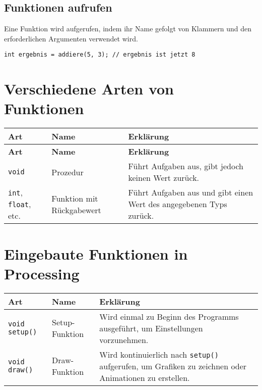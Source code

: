 \documentclass{article}
\begin{document}
\subsection*{Funktionen aufrufen}

Eine Funktion wird aufgerufen, indem ihr Name gefolgt von Klammern und den erforderlichen Argumenten verwendet wird.

\begin{lstlisting}
int ergebnis = addiere(5, 3); // ergebnis ist jetzt 8
\end{lstlisting}

\section*{Verschiedene Arten von Funktionen}

\begin{longtable}{|p{}|p{}|p{}|}
\hline
\textbf{Art} & \textbf{Name} & \textbf{Erklärung} \\
\hline
\endfirsthead

\hline
\textbf{Art} & \textbf{Name} & \textbf{Erklärung} \\
\hline
\endhead

\texttt{void} & Prozedur & Führt Aufgaben aus, gibt jedoch keinen Wert zurück. \\
\hline

\texttt{int}, \texttt{float}, etc. & Funktion mit Rückgabewert & Führt Aufgaben aus und gibt einen Wert des angegebenen Typs zurück. \\
\hline

\end{longtable}

\section*{Eingebaute Funktionen in Processing}

\begin{longtable}{|p{}|p{}|p{}|}
    \hline
    \textbf{Art} & \textbf{Name} & \textbf{Erklärung} \\
    \hline
    \endfirsthead

\texttt{void setup()} & Setup-Funktion & Wird einmal zu Beginn des Programms ausgeführt, um Einstellungen vorzunehmen. \\
\hline

\texttt{void draw()} & Draw-Funktion & Wird kontinuierlich nach \texttt{setup()} aufgerufen, um Grafiken zu zeichnen oder Animationen zu erstellen. \\
\hline


\end{longtable}
\end{document}
